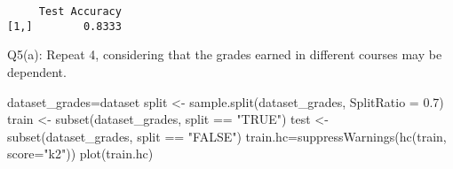 \documentclass[
]{article}
\newenvironment{Shaded}{\begin{snugshade}}{\end{snugshade}}
\newcommand{\AttributeTok}[1]{\textcolor[rgb]{0.77,0.63,0.00}{#1}}
\newcommand{\DecValTok}[1]{\textcolor[rgb]{0.00,0.00,0.81}{#1}}
\newcommand{\FloatTok}[1]{\textcolor[rgb]{0.00,0.00,0.81}{#1}}
\newcommand{\FunctionTok}[1]{\textcolor[rgb]{0.00,0.00,0.00}{#1}}
\newcommand{\NormalTok}[1]{#1}
\newcommand{\OtherTok}[1]{\textcolor[rgb]{0.56,0.35,0.01}{#1}}
\newcommand{\SpecialCharTok}[1]{\textcolor[rgb]{0.00,0.00,0.00}{#1}}
\newcommand{\StringTok}[1]{\textcolor[rgb]{0.31,0.60,0.02}{#1}}
\begin{document}
\begin{Shaded}
\end{Shaded}

\begin{verbatim}
     Test Accuracy
[1,]        0.8333
\end{verbatim}

Q5(a): Repeat 4, considering that the grades earned in different courses
may be dependent.

\begin{Shaded}
\begin{Highlighting}[]
\NormalTok{dataset\_grades}\OtherTok{=}\NormalTok{dataset}
\NormalTok{split }\OtherTok{\textless{}{-}} \FunctionTok{sample.split}\NormalTok{(dataset\_grades, }\AttributeTok{SplitRatio =} \FloatTok{0.7}\NormalTok{)}
\NormalTok{train }\OtherTok{\textless{}{-}} \FunctionTok{subset}\NormalTok{(dataset\_grades, split }\SpecialCharTok{==} \StringTok{"TRUE"}\NormalTok{)}
\NormalTok{test }\OtherTok{\textless{}{-}} \FunctionTok{subset}\NormalTok{(dataset\_grades, split }\SpecialCharTok{==} \StringTok{"FALSE"}\NormalTok{)}
\NormalTok{train.hc}\OtherTok{=}\FunctionTok{suppressWarnings}\NormalTok{(}\FunctionTok{hc}\NormalTok{(train, }\AttributeTok{score=}\StringTok{"k2"}\NormalTok{))}
\FunctionTok{plot}\NormalTok{(train.hc)}
\end{Highlighting}
\end{Shaded}
\end{document}
